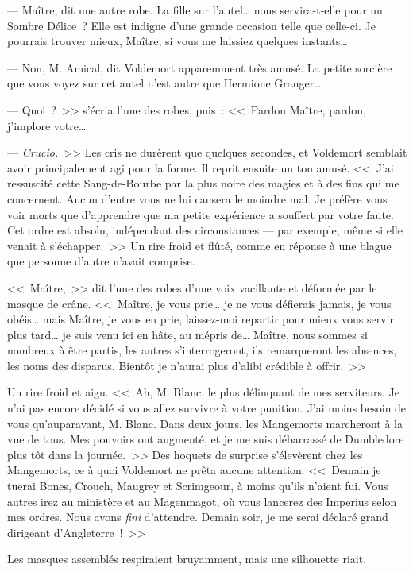 --- Maître, dit une autre robe. La fille sur l'autel… nous servira-t-elle pour un Sombre Délice~? Elle est indigne d'une grande occasion telle que celle-ci. Je pourrais trouver mieux, Maître, si vous me laissiez quelques instants…

--- Non, M. Amical, dit Voldemort apparemment très amusé. La petite sorcière que vous voyez sur cet autel n'est autre que Hermione Granger…

--- Quoi~?~>> s'écria l'une des robes, puis~: <<~Pardon Maître, pardon, j'implore votre…

--- \emph{Crucio.}~>> Les cris ne durèrent que quelques secondes, et Voldemort semblait avoir principalement agi pour la forme. Il reprit ensuite un ton amusé. <<~J'ai ressuscité cette Sang-de-Bourbe par la plus noire des magies et à des fins qui me concernent. Aucun d'entre vous ne lui causera le moindre mal. Je préfère vous voir morts que d'apprendre que ma petite expérience a souffert par votre faute. Cet ordre est absolu, indépendant des circonstances — par exemple, même si elle venait à s'échapper.~>> Un rire froid et flûté, comme en réponse à une blague que personne d'autre n'avait comprise.

<<~Maître,~>> dit l'une des robes d'une voix vacillante et déformée par le masque de crâne. <<~Maître, je vous prie… je ne vous défierais jamais, je vous obéis… mais Maître, je vous en prie, laissez-moi repartir pour mieux vous servir plus tard… je suis venu ici en hâte, au mépris de… Maître, nous sommes si nombreux à être partis, les autres s'interrogeront, ils remarqueront les absences, les noms des disparus. Bientôt je n'aurai plus d'alibi crédible à offrir.~>>

Un rire froid et aigu. <<~Ah, M. Blanc, le plus délinquant de mes serviteurs. Je n'ai pas encore décidé si vous allez survivre à votre punition. J'ai moins besoin de vous qu'auparavant, M. Blanc. Dans deux jours, les Mangemorts marcheront à la vue de tous. Mes pouvoirs ont augmenté, et je me suis débarrassé de Dumbledore plus tôt dans la journée.~>> Des hoquets de surprise s'élevèrent chez les Mangemorts, ce à quoi Voldemort ne prêta aucune attention. <<~Demain je tuerai Bones, Crouch, Maugrey et Scrimgeour, à moins qu'ils n'aient fui. Vous autres irez au ministère et au Magenmagot, où vous lancerez des Imperius selon mes ordres. Nous avons \emph{fini} d'attendre. Demain soir, je me serai déclaré grand dirigeant d'Angleterre~!~>>

Les masques assemblés respiraient bruyamment, mais une silhouette riait.

